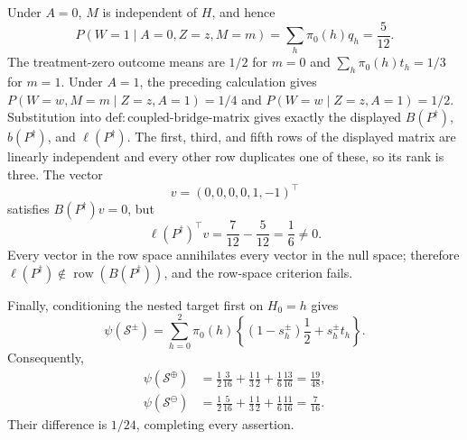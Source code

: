 Under \(A=0\), \(M\) is independent of \(H\), and hence
\[
 P(W=1\mid A=0,Z=z,M=m)=\sum_h\pi _0(h)q_h=\frac5{12}.
\]
The treatment-zero outcome means are \(1/2\) for \(m=0\) and
\(\sum_h\pi _0(h)t_h=1/3\) for \(m=1\).  Under \(A=1\), the preceding
calculation gives \(P(W=w,M=m\mid Z=z,A=1)=1/4\) and
\(P(W=w\mid Z=z,A=1)=1/2\).  Substitution into
\(\mathrm{def{:}coupled\text{-}bridge\text{-}matrix}\) gives exactly the
displayed \(B(P^{\dagger})\), \(b(P^{\dagger})\), and
\(\ell(P^{\dagger})\).  The first, third, and fifth rows of the displayed
matrix are linearly independent and every other row duplicates one of these,
so its rank is three.  The vector
\[
 v=(0,0,0,0,1,-1)^{\top}
\]
satisfies \(B(P^{\dagger})v=0\), but
\[
 \ell(P^{\dagger})^{\top}v=\frac7{12}-\frac5{12}=\frac16\ne0.
\]
Every vector in the row space annihilates every vector in the null space;
therefore \(\ell(P^{\dagger})\notin
\operatorname{row}(B(P^{\dagger}))\), and the row-space criterion fails.

Finally, conditioning the nested target first on \(H_0=h\) gives
\[
 \psi(\mathcal S^{\pm})
 =\sum_{h=0}^2\pi _0(h)
 \left\{(1-s_h^{\pm})\frac12+s_h^{\pm}t_h\right\}.
\]
Consequently,
\[
\begin{aligned}
 \psi(\mathcal S^{\oplus})
 &=\frac12\frac3{16}+\frac13\frac12+\frac16\frac{13}{16}
   =\frac{19}{48},\\
 \psi(\mathcal S^{\ominus})
 &=\frac12\frac5{16}+\frac13\frac12+\frac16\frac{11}{16}
   =\frac7{16}.
\end{aligned}
\]
Their difference is \(1/24\), completing every assertion.